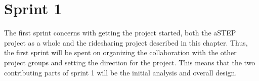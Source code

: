 \chapter{Sprint 1}
The first sprint concerns with getting the project started, both the aSTEP project as a whole and the ridesharing project described in this chapter.
Thus, the first sprint will be spent on organizing the collaboration with the other project groups and setting the direction for the project.
This means that the two contributing parts of sprint 1 will be the initial analysis and overall design.


%
%